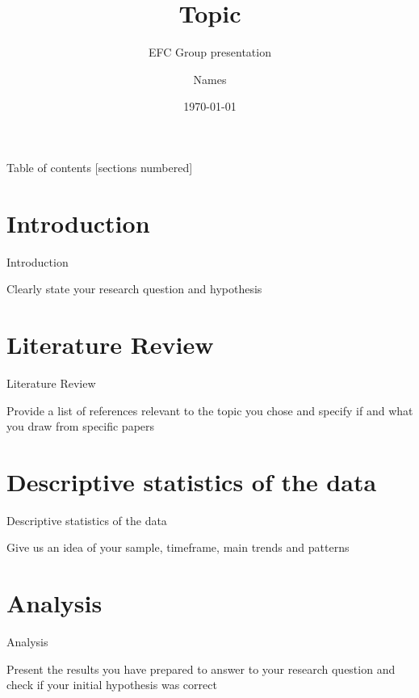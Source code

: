 \documentclass[10pt,xcolor=dvipsnames]{beamer}
\title{Topic}
\subtitle{EFC Group presentation}
\date{\today}
\author{Names}
\institute{}
\begin{document}
\maketitle

\begin{frame}{Table of contents}
  [sections numbered]
  \tableofcontents%
\end{frame}

\section[Intro]{Introduction}

\begin{frame}[fragile]{Introduction}

Clearly state your research question and hypothesis
  
\end{frame}

\section{Literature Review}

\begin{frame}{Literature Review}

Provide a list of references relevant to the topic you chose and specify if and what you draw from specific papers


\end{frame}


\section{Descriptive statistics of the data}

\begin{frame}{Descriptive statistics of the data}

Give us an idea of your sample, timeframe, main trends and patterns

\end{frame}


\section{Analysis}

\begin{frame}{Analysis}

Present the results you have prepared to answer to your research question and check if your initial hypothesis was correct


\end{frame}
\end{document}

